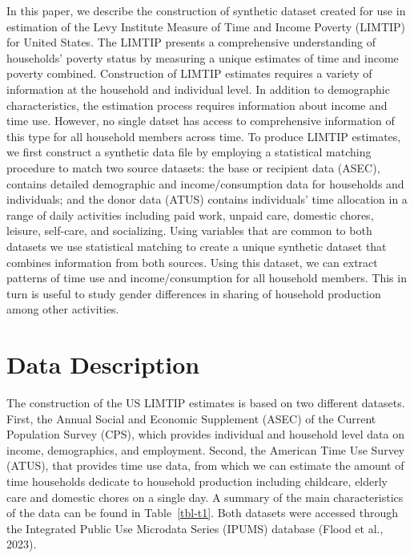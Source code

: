 \documentclass[
  11pt,
]{article}
\begin{document}
In this paper, we describe the construction of synthetic dataset created
for use in estimation of the Levy Institute Measure of Time and Income
Poverty (LIMTIP) for United States. The LIMTIP presents a comprehensive
understanding of households' poverty status by measuring a unique
estimates of time and income poverty combined. Construction of LIMTIP
estimates requires a variety of information at the household and
individual level. In addition to demographic characteristics, the
estimation process requires information about income and time use.
However, no single datset has access to comprehensive information of
this type for all household members across time. To produce LIMTIP
estimates, we first construct a synthetic data file by employing a
statistical matching procedure to match two source datasets: the base or
recipient data (ASEC), contains detailed demographic and
income/consumption data for households and individuals; and the donor
data (ATUS) contains individuals' time allocation in a range of daily
activities including paid work, unpaid care, domestic chores, leisure,
self-care, and socializing. Using variables that are common to both
datasets we use statistical matching to create a unique synthetic
dataset that combines information from both sources. Using this dataset,
we can extract patterns of time use and income/consumption for all
household members. This in turn is useful to study gender differences in
sharing of household production among other activities.

\section{Data Description}\label{data-description}

The construction of the US LIMTIP estimates is based on two different
datasets. First, the Annual Social and Economic Supplement (ASEC) of the
Current Population Survey (CPS), which provides individual and household
level data on income, demographics, and employment. Second, the American
Time Use Survey (ATUS), that provides time use data, from which we can
estimate the amount of time households dedicate to household production
including childcare, elderly care and domestic chores on a single day. A
summary of the main characteristics of the data can be found in
Table~\ref{tbl-t1}. Both datasets were accessed through the Integrated
Public Use Microdata Series (IPUMS) database (Flood et al., 2023).
\end{document}
